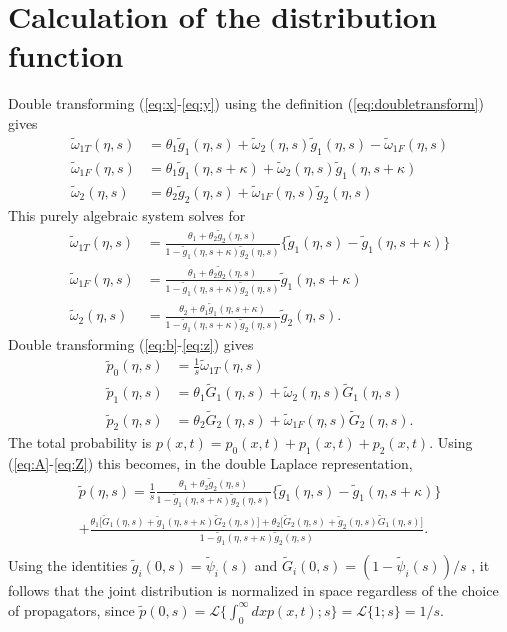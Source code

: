 \documentclass[]{agujournal2018}
\newcommand\tom{\tilde{\omega}}
\newcommand\tg{\tilde{g}}
\newcommand\tp{\tilde{p}}
\newcommand\tG{\tilde{G}}
\begin{document}
\section{Calculation of the distribution function}
\label{sec:appendixA}
Double transforming (\ref{eq:x}-\ref{eq:y}) using the definition (\ref{eq:doubletransform}) gives
\begin{align}
\tom_{1T}(\eta,s) &= \theta_1 \tg_1(\eta,s) + \tom_2(\eta,s)\tg_1(\eta,s)-\tom_{1F}(\eta,s)\\
\tom_{1F}(\eta,s) &= \theta_1\tg_1(\eta,s+\kappa) + \tom_2(\eta,s)\tg_1(\eta,s+\kappa)\\
\tom_2(\eta,s) &= \theta_2 \tg_2(\eta,s) + \tom_{1F}(\eta,s)\tg_2(\eta,s)
\end{align}
This purely algebraic system solves for 
\begin{align}
\tom_{1T}(\eta,s) &= \frac{\theta_1 + \theta_2 \tg_2(\eta,s)}{1-\tg_1(\eta,s+\kappa)\tg_2(\eta,s)}\big\{\tg_1(\eta,s)-\tg_1(\eta,s+\kappa) \big\} \label{eq:A} \\
\tom_{1F}(\eta,s) &= \frac{\theta_1 + \theta_2 \tg_2(\eta,s)}{1-\tg_1(\eta,s+\kappa)\tg_2(\eta,s)}\tg_1(\eta,s+\kappa)\\
\tom_{2}(\eta,s) &= \frac{\theta_2 + \theta_1 \tg_1(\eta,s+\kappa)}{1-\tg_1(\eta,s+\kappa)\tg_2(\eta,s)}\tg_2(\eta,s). 
\end{align}
Double transforming (\ref{eq:b}-\ref{eq:z}) gives
\begin{align}
\tp_0(\eta,s) &= \frac{1}{s}\tom_{1T}(\eta,s)\\
\tp_1(\eta,s) &= \theta_1 \tG_1(\eta,s) + \tom_2(\eta,s) \tG_1(\eta,s) \\
\tp_2(\eta,s) &= \theta_2 \tG_2(\eta,s) + \tom_{1F}(\eta,s)\tG_2(\eta,s).\label{eq:Z}
\end{align}
The total probability is $p(x,t) = p_0(x,t) + p_1(x,t) + p_2(x,t)$. Using (\ref{eq:A}-\ref{eq:Z}) this becomes, in the double Laplace representation, 
\begin{multline}
\tp(\eta,s) = \frac{1}{s}\frac{\theta_1 + \theta_2 \tg_2(\eta,s)}{1-\tg_1(\eta,s+\kappa)\tg_2(\eta,s)}\big\{\tg_1(\eta,s)-\tg_1(\eta,s+\kappa) \big\} \\
+\frac{\theta_1\big[\tG_1(\eta,s) + \tg_1(\eta,s+\kappa)\tG_2(\eta,s)\big]+ \theta_2\big[\tG_2(\eta,s) + \tg_2(\eta,s)\tG_1(\eta,s)\big]}{1-\tg_1(\eta,s+\kappa)\tg_2(\eta,s)}. \\
\label{eq:lap}
\end{multline}
Using the identities $\tg_i(0,s) = \tilde{\psi}_i(s)$ and $\tG_i(0,s) = (1-\tilde{\psi}_i(s))/s$ \citep[e.g.][]{Weiss1994}, it follows that the joint distribution is normalized in space regardless of the choice of propagators, since $\tp(0,s) = \mathcal{L}\{\int_0^\infty dx p(x,t);s\} = \mathcal{L}\{1;s\} = 1/s$.
\end{document}

